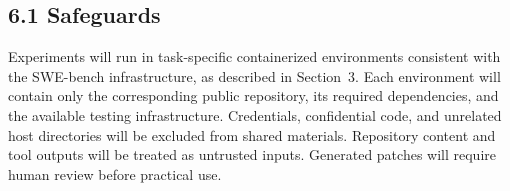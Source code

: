 \documentclass[11pt]{article}
\begin{document}
\subsection*{6.1 Safeguards}

Experiments will run in task-specific containerized environments
consistent with the SWE-bench infrastructure, as described in Section~3.
Each environment will contain only the corresponding public repository,
its required dependencies, and the available testing infrastructure.
Credentials, confidential code, and unrelated host directories will be
excluded from shared materials. Repository content and tool outputs will
be treated as untrusted inputs. Generated patches will require human
review before practical use.





\end{document}
